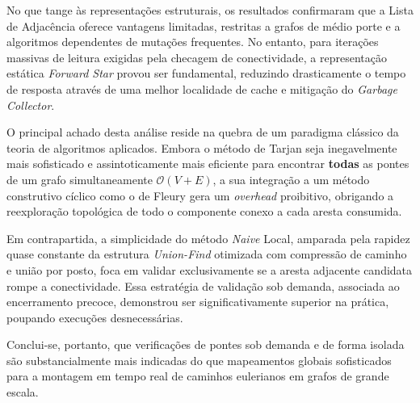 \documentclass[12pt]{article}
\begin{document}
No que tange às representações estruturais, os resultados confirmaram que a Lista de Adjacência oferece vantagens limitadas, restritas a grafos de médio porte e a algoritmos dependentes de mutações frequentes. No entanto, para iterações massivas de leitura exigidas pela checagem de conectividade, a representação estática \textit{Forward Star} provou ser fundamental, reduzindo drasticamente o tempo de resposta através de uma melhor localidade de cache e mitigação do \textit{Garbage Collector}.

O principal achado desta análise reside na quebra de um paradigma clássico da teoria de algoritmos aplicados. Embora o método de Tarjan seja inegavelmente mais sofisticado e assintoticamente mais eficiente para encontrar \textbf{todas} as pontes de um grafo simultaneamente $\mathcal{O}(V+E)$, a sua integração a um método construtivo cíclico como o de Fleury gera um \textit{overhead} proibitivo, obrigando a reexploração topológica de todo o componente conexo a cada aresta consumida.

Em contrapartida, a simplicidade do método \textit{Naive} Local, amparada pela rapidez quase constante da estrutura \textit{Union-Find} otimizada com compressão de caminho e união por posto, foca em validar exclusivamente se a aresta adjacente candidata rompe a conectividade. Essa estratégia de validação sob demanda, associada ao encerramento precoce, demonstrou ser significativamente superior na prática, poupando execuções desnecessárias.

Conclui-se, portanto, que verificações de pontes sob demanda e de forma isolada são substancialmente mais indicadas do que mapeamentos globais sofisticados para a montagem em tempo real de caminhos eulerianos em grafos de grande escala.



\end{document}
